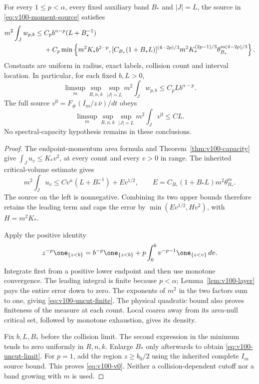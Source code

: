 \begin{theorem}
\label{thm:v100-uncut}
For every $1\le p<\alpha$, every fixed auxiliary band $B_*$ and
$|J|=L$, the source in \eqref{eq:v100-moment-source} satisfies
\begin{align}
 m^2\int_J w_{p,b}\le{}&C_p b^{\alpha-p}(L+B_*^{-1})\notag\\
 &+C_p\min\left\{m^2K_*b^{2-p},
 [C_{B_*}(1+B_*L)]^{(4-2p)/3}
 m^2K_*^{(2p-1)/3}\theta_{B_*}^{m(4-2p)/3}\right\}.
                                               \label{eq:v100-uncut-finite}
\end{align}
Constants are uniform in radius, exact labels, collision count and
interval location. In particular, for each fixed $b,L>0$,
\begin{equation}\label{eq:v100-uncut-limit}
 \limsup_m\sup_{R,n,k}\sup_{|J|=L}m^2\int_J w_{p,b}
                                      \le C_p Lb^{\alpha-p}.
\end{equation}
The full source $v^0=F_\#(I_m/z\,\bar\nu)/dt$ obeys
\begin{equation}\label{eq:v100-v0}
 \limsup_m\sup_{R,n,k}\sup_{|J|=L}m^2\int_Jv^0\le CL.
\end{equation}
No spectral-capacity hypothesis remains in these conclusions.
\end{theorem}
\begin{proof}
The endpoint-momentum area formula and
Theorem~\ref{thm:v100-capacity} give
$\int_Ju_v\le K_*v^2$, at every count and every $v>0$ in range.
The inherited critical-volume estimate gives
\[
 m^2\int_Ju_v\le C v^\alpha(L+B_*^{-1})+Ev^{1/2},
 \qquad E=C_{B_*}(1+B_*L)m^2\theta_{B_*}^m.
\]
The source on the left is nonnegative. Combining its two upper
bounds therefore retains the leading term and caps the error by
$\min(Ev^{1/2},Hv^2)$, with $H=m^2K_*$.

Apply the positive identity
\[
 z^{-p}\one_{\{z<b\}}=
 b^{-p}\one_{\{z<b\}}+
 p\int_0^b v^{-p-1}\one_{\{z<v\}}\,dv.
\]
Integrate first from a positive lower endpoint and then use monotone
convergence. The leading integral is finite because $p<\alpha$;
Lemma~\ref{lem:v100-layer} pays the entire error down to zero.
The exponents of $m^2$ in the two factors sum to one, giving
\eqref{eq:v100-uncut-finite}. The physical quadratic bound also
proves finiteness of the measure at each count. Local coarea away
from its area-null critical set, followed by monotone exhaustion,
gives its density.

Fix $b,L,B_*$ before the collision limit. The second expression in
the minimum tends to zero uniformly in $R,n,k$. Enlarge $B_*$ only
afterwards to obtain \eqref{eq:v100-uncut-limit}. For $p=1$, add
the region $z\ge b_0/2$ using the inherited complete $I_m$ source
bound. This proves \eqref{eq:v100-v0}. Neither a collision-dependent
cutoff nor a band growing with $m$ is used.
\end{proof}
